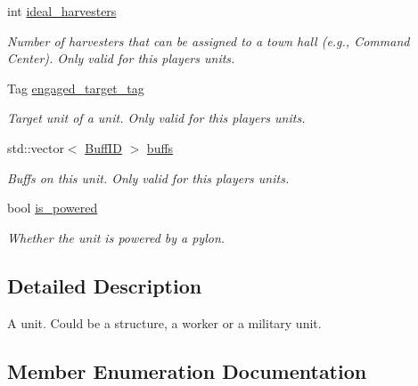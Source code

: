 \begin{DoxyCompactItemize}
\mbox{\label{classsc2_1_1_unit_a59c9e7c9c14f50f11d33b58716f664fe}} 
int \hyperlink{classsc2_1_1_unit_a59c9e7c9c14f50f11d33b58716f664fe}{ideal\+\_\+harvesters}
\begin{DoxyCompactList}\small\item\em Number of harvesters that can be assigned to a town hall (e.\+g., Command Center). Only valid for this player\textquotesingle{}s units. \end{DoxyCompactList}\item 
\mbox{\label{classsc2_1_1_unit_a0d1cc770a037ed2458bf944a787dcca5}} 
Tag \hyperlink{classsc2_1_1_unit_a0d1cc770a037ed2458bf944a787dcca5}{engaged\+\_\+target\+\_\+tag}
\begin{DoxyCompactList}\small\item\em Target unit of a unit. Only valid for this player\textquotesingle{}s units. \end{DoxyCompactList}\item 
\mbox{\label{classsc2_1_1_unit_a34f17705c61114ad78c192ed7b06a9af}} 
std\+::vector$<$ \hyperlink{classsc2_1_1_s_c2_type}{Buff\+ID} $>$ \hyperlink{classsc2_1_1_unit_a34f17705c61114ad78c192ed7b06a9af}{buffs}
\begin{DoxyCompactList}\small\item\em Buffs on this unit. Only valid for this player\textquotesingle{}s units. \end{DoxyCompactList}\item 
\mbox{\label{classsc2_1_1_unit_a13e408736f731902adb60d2725507dc9}} 
bool \hyperlink{classsc2_1_1_unit_a13e408736f731902adb60d2725507dc9}{is\+\_\+powered}
\begin{DoxyCompactList}\small\item\em Whether the unit is powered by a pylon. \end{DoxyCompactList}\end{DoxyCompactItemize}


\subsection{Detailed Description}
A unit. Could be a structure, a worker or a military unit. 

\subsection{Member Enumeration Documentation}
\mbox{\label{classsc2_1_1_unit_a5a40e672e7599d73ef8ef5758bbd7461}} 
